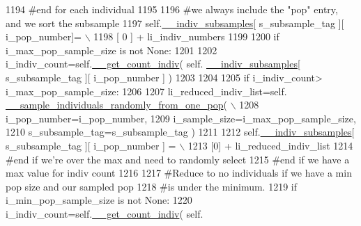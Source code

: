 \begin{DoxyCode}
1194             \textcolor{comment}{#end for each individual}
1195 
1196             \textcolor{comment}{#we always include the "pop" entry, and we sort the subsample}
1197             self.\hyperlink{classnegui_1_1genepopfilemanager_1_1GenepopFileManager_a1e8379bcee4902ca9314ff53fcb71644}{\_\_indiv\_subsamples}[ s\_subsample\_tag ][ i\_pop\_number]= \(\backslash\)
1198                                                  [ 0 ] +  li\_indiv\_numbers
1199 
1200             \textcolor{keywordflow}{if} i\_max\_pop\_sample\_size \textcolor{keywordflow}{is} \textcolor{keywordflow}{not} \textcolor{keywordtype}{None}:
1201 
1202                 i\_indiv\_count=self.\hyperlink{classnegui_1_1genepopfilemanager_1_1GenepopFileManager_ac7cc98fe56efee82b4ffd4dc816a4704}{\_\_get\_count\_indiv}( self.
      \hyperlink{classnegui_1_1genepopfilemanager_1_1GenepopFileManager_a1e8379bcee4902ca9314ff53fcb71644}{\_\_indiv\_subsamples}[ s\_subsample\_tag ][ i\_pop\_number ] )
1203 
1204                 
1205                 \textcolor{keywordflow}{if} i\_indiv\_count> i\_max\_pop\_sample\_size:
1206 
1207                     li\_reduced\_indiv\_list=self.
      \hyperlink{classnegui_1_1genepopfilemanager_1_1GenepopFileManager_a9818467c9cb40f8e1de0c6cc7f52e263}{\_\_sample\_individuals\_randomly\_from\_one\_pop}( \(\backslash\)
1208                                                             i\_pop\_number=i\_pop\_number,
1209                                                             i\_sample\_size=i\_max\_pop\_sample\_size,
1210                                                             s\_subsample\_tag=s\_subsample\_tag )
1211 
1212                     self.\hyperlink{classnegui_1_1genepopfilemanager_1_1GenepopFileManager_a1e8379bcee4902ca9314ff53fcb71644}{\_\_indiv\_subsamples}[ s\_subsample\_tag ][ i\_pop\_number ] = \(\backslash\)
1213                                                         [0] + li\_reduced\_indiv\_list
1214                 \textcolor{comment}{#end if we're over the max and need to randomly select}
1215             \textcolor{comment}{#end if we have a max value for indiv count}
1216 
1217             \textcolor{comment}{#Reduce to no individuals if we have a min pop size and our sampled pop}
1218             \textcolor{comment}{#is under the minimum.}
1219             \textcolor{keywordflow}{if} i\_min\_pop\_sample\_size \textcolor{keywordflow}{is} \textcolor{keywordflow}{not} \textcolor{keywordtype}{None}:
1220                 i\_indiv\_count=self.\hyperlink{classnegui_1_1genepopfilemanager_1_1GenepopFileManager_ac7cc98fe56efee82b4ffd4dc816a4704}{\_\_get\_count\_indiv}( self.

\end{DoxyCode}
